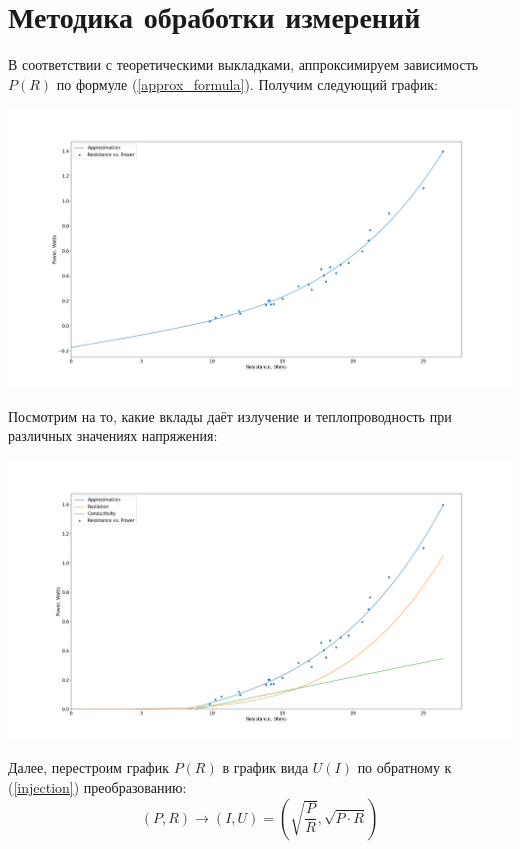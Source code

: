 \documentclass[12pt]{article}
\begin{document}
    \section{Методика обработки измерений}
    В соответствии с теоретическими выкладками, аппроксимируем зависимость $P(R)$ по формуле (\ref{approx_formula}). Получим следующий график:

    {
        \centering
        \includegraphics[width=\linewidth]{images/Resistance_vs_Power_clear_approximation.png}
        \label{fig:resistance_power_approximated}
    }

    Посмотрим на то, какие вклады даёт излучение и теплопроводность при различных значениях напряжения:

    {
        \centering
        \includegraphics{images/resistance_vs_power_with_approximation.png}
        \label{fig:resistance_power_approximated_by_parts}
    }

    Далее, перестроим график $P(R)$ в график вида $U(I)$ по обратному к (\ref{injection}) преобразованию:
    \begin{equation*}
        (P, R) \longrightarrow (I, U) = \left( \sqrt{\frac{P}{R}}, \sqrt{P \cdot R}\right)
    \end{equation*}
\end{document}
